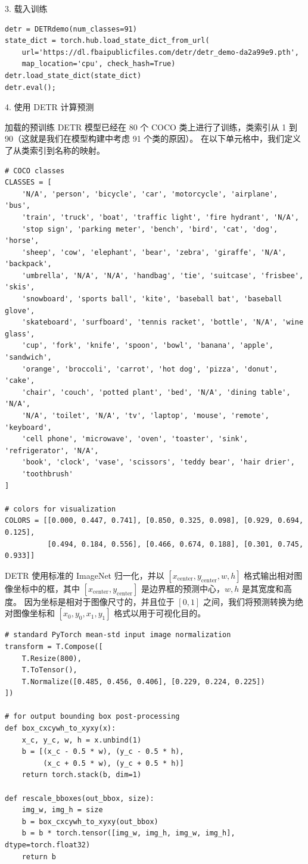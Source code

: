3. 载入训练

\begin{Verbatim}
detr = DETRdemo(num_classes=91)
state_dict = torch.hub.load_state_dict_from_url(
    url='https://dl.fbaipublicfiles.com/detr/detr_demo-da2a99e9.pth',
    map_location='cpu', check_hash=True)
detr.load_state_dict(state_dict)
detr.eval();
\end{Verbatim}

4. 使用 DETR 计算预测

加载的预训练 DETR 模型已经在 80 个 COCO 类上进行了训练，类索引从 1 到 90（这就是我们在模型构建中考虑 91 个类的原因）。 在以下单元格中，我们定义了从类索引到名称的映射。

\begin{Verbatim}
# COCO classes
CLASSES = [
    'N/A', 'person', 'bicycle', 'car', 'motorcycle', 'airplane', 'bus',
    'train', 'truck', 'boat', 'traffic light', 'fire hydrant', 'N/A',
    'stop sign', 'parking meter', 'bench', 'bird', 'cat', 'dog', 'horse',
    'sheep', 'cow', 'elephant', 'bear', 'zebra', 'giraffe', 'N/A', 'backpack',
    'umbrella', 'N/A', 'N/A', 'handbag', 'tie', 'suitcase', 'frisbee', 'skis',
    'snowboard', 'sports ball', 'kite', 'baseball bat', 'baseball glove',
    'skateboard', 'surfboard', 'tennis racket', 'bottle', 'N/A', 'wine glass',
    'cup', 'fork', 'knife', 'spoon', 'bowl', 'banana', 'apple', 'sandwich',
    'orange', 'broccoli', 'carrot', 'hot dog', 'pizza', 'donut', 'cake',
    'chair', 'couch', 'potted plant', 'bed', 'N/A', 'dining table', 'N/A',
    'N/A', 'toilet', 'N/A', 'tv', 'laptop', 'mouse', 'remote', 'keyboard',
    'cell phone', 'microwave', 'oven', 'toaster', 'sink', 'refrigerator', 'N/A',
    'book', 'clock', 'vase', 'scissors', 'teddy bear', 'hair drier',
    'toothbrush'
]

# colors for visualization
COLORS = [[0.000, 0.447, 0.741], [0.850, 0.325, 0.098], [0.929, 0.694, 0.125],
          [0.494, 0.184, 0.556], [0.466, 0.674, 0.188], [0.301, 0.745, 0.933]]
\end{Verbatim}


DETR 使用标准的 ImageNet 归一化，并以 $[x_{\text{center}}, y_{\text{center}}, w, h]$ 格式输出相对图像坐标中的框，其中 $[x_{\text{center}}, y_{\text{center}}]$ 是边界框的预测中心，$w, h$ 是其宽度和高度。 因为坐标是相对于图像尺寸的，并且位于 $[0, 1]$ 之间，我们将预测转换为绝对图像坐标和 $[x_0, y_0, x_1, y_1]$ 格式以用于可视化目的。

\begin{Verbatim}
# standard PyTorch mean-std input image normalization
transform = T.Compose([
    T.Resize(800),
    T.ToTensor(),
    T.Normalize([0.485, 0.456, 0.406], [0.229, 0.224, 0.225])
])

# for output bounding box post-processing
def box_cxcywh_to_xyxy(x):
    x_c, y_c, w, h = x.unbind(1)
    b = [(x_c - 0.5 * w), (y_c - 0.5 * h),
         (x_c + 0.5 * w), (y_c + 0.5 * h)]
    return torch.stack(b, dim=1)

def rescale_bboxes(out_bbox, size):
    img_w, img_h = size
    b = box_cxcywh_to_xyxy(out_bbox)
    b = b * torch.tensor([img_w, img_h, img_w, img_h], dtype=torch.float32)
    return b
\end{Verbatim}


